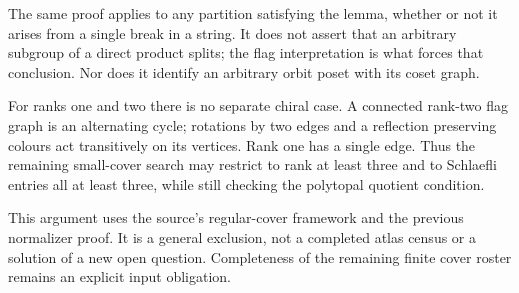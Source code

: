 \documentclass[11pt,a4paper]{article}
\begin{document}
The same proof applies to any partition satisfying the lemma, whether
or not it arises from a single break in a string. It does not assert
that an arbitrary subgroup of a direct product splits; the flag
interpretation is what forces that conclusion. Nor does it identify
an arbitrary orbit poset with its coset graph.

For ranks one and two there is no separate chiral case. A connected
rank-two flag graph is an alternating cycle; rotations by two edges
and a reflection preserving colours act transitively on its vertices.
Rank one has a single edge. Thus the remaining small-cover search may
restrict to rank at least three and to Schlaefli entries all at least
three, while still checking the polytopal quotient condition.

This argument uses the source's regular-cover framework and the
previous normalizer proof. It is a general exclusion, not a completed
atlas census or a solution of a new open question. Completeness of the
remaining finite cover roster remains an explicit input obligation.
\end{document}

